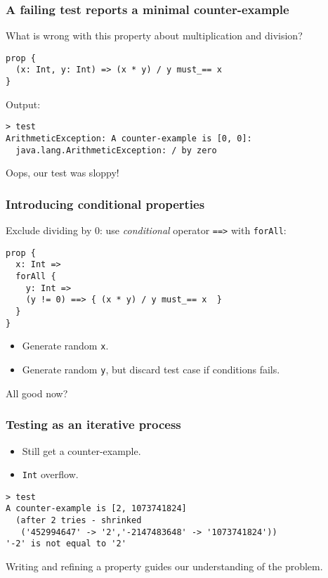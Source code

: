 \documentclass{beamer}
\begin{document}
\begin{frame}[fragile]
  \frametitle{A failing test reports a minimal counter-example}

  What is wrong with this property about multiplication and division?

  \begin{verbatim}
prop {
  (x: Int, y: Int) => (x * y) / y must_== x
}
  \end{verbatim}

  Output:

  \begin{verbatim}
> test
ArithmeticException: A counter-example is [0, 0]:
  java.lang.ArithmeticException: / by zero
  \end{verbatim}

  Oops, our test was sloppy!
\end{frame}

\begin{frame}[fragile]
  \frametitle{Introducing conditional properties}

  Exclude dividing by 0: use \emph{conditional} operator \texttt{==>} with \texttt{forAll}:

  \begin{verbatim}
prop {
  x: Int =>
  forAll {
    y: Int =>
    (y != 0) ==> { (x * y) / y must_== x  }
  }
}
  \end{verbatim}

  \begin{itemize}
    \item Generate random \texttt{x}.
    \item Generate random \texttt{y}, but discard test case if conditions fails.
  \end{itemize}

  All good now?
\end{frame}

\begin{frame}[fragile]
  \frametitle{Testing as an iterative process}

  \begin{itemize}
    \item Still get a counter-example.
    \item \texttt{Int} overflow.
  \end{itemize}

  \begin{verbatim}
> test
A counter-example is [2, 1073741824]
  (after 2 tries - shrinked
   ('452994647' -> '2','-2147483648' -> '1073741824'))
'-2' is not equal to '2'
  \end{verbatim}

  Writing and refining a property guides our understanding of the problem.
\end{frame}
\end{document}
